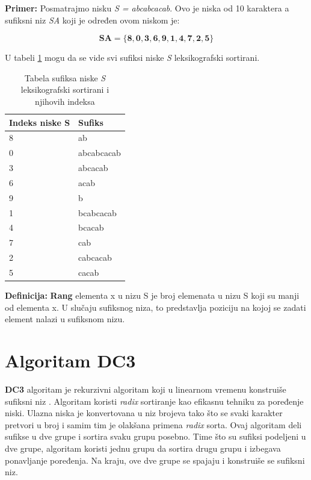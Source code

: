 \documentclass[serbian]{article}
\begin{document}
\textbf{Primer:} Posmatrajmo nisku \textit{S = abcabcacab}. Ovo je niska od 10 karaktera a sufiksni niz \textit{SA} koji je određen ovom niskom je:

\begin{equation}
\mathbf{SA = \{8, 0, 3, 6, 9, 1, 4, 7, 2, 5\}}
\end{equation}

U tabeli \ref{table:1} mogu da se vide svi sufiksi niske \textit{S} leksikografski sortirani.

\begin{table}[h!]
    \begin{center}
        \begin{tabular}{|l|l|} \hline
        \textbf{Indeks niske S} & \textbf{Sufiks}\\ \hline
        8 & ab\\ \hline
        0 & abcabcacab\\ \hline
        3 & abcacab\\ \hline
        6 & acab\\ \hline
        9 & b\\ \hline
        1 & bcabcacab\\ \hline
        4 & bcacab\\ \hline
        7 & cab\\ \hline
        2 & cabcacab\\ \hline
        5 & cacab\\ \hline
        \end{tabular}
        \caption{Tabela sufiksa niske \textit{S} leksikografski sortirani i njihovih indeksa}
        \label{table:1}
    \end{center}
\end{table}

\textbf{Definicija:} \textbf{Rang} elementa x u nizu S je broj elemenata u nizu S koji su manji od elementa x. U slučaju sufiksnog niza, to predstavlja poziciju na kojoj se zadati element nalazi u sufiksnom nizu.

\section{Algoritam DC3}

\textbf{DC3} algoritam je rekurzivni algoritam koji u linearnom vremenu konstruiše sufiksni niz \cite{sanders_peter, presentation_dc3, master_dc3}. Algoritam koristi \textit{radix} sortiranje kao efikasnu tehniku za poređenje niski. Ulazna niska je konvertovana u niz brojeva tako što se svaki karakter pretvori u broj i samim tim je olakšana primena \textit{radix} sorta. Ovaj algoritam deli sufikse u dve grupe i sortira svaku grupu posebno. Time što su sufiksi podeljeni u dve grupe, algoritam koristi jednu grupu da sortira drugu grupu i izbegava ponavljanje poređenja. Na kraju, ove dve grupe se spajaju i konstruiše se sufiksni niz.
\end{document}
